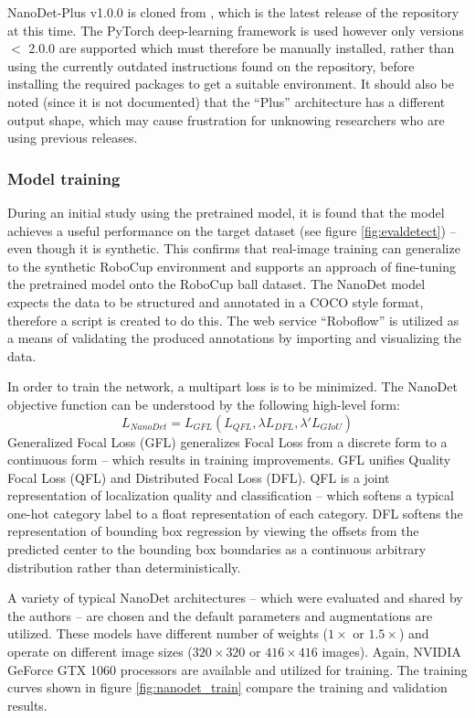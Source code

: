 \documentclass[a4paper,twoside,12pt]{report}
\begin{document}
NanoDet-Plus v1.0.0 is cloned from \cite{nanodet}, which is the latest release of the repository at this time. The PyTorch deep-learning framework is used however only versions $<$ 2.0.0 are supported which must therefore be manually installed, rather than using the currently outdated instructions found on the repository, before installing the required packages to get a suitable environment. It should also be noted (since it is not documented) that the ``Plus'' architecture has a different output shape, which may cause frustration for unknowing researchers who are using previous releases.

\subsubsection{Model training}

During an initial study using the pretrained model, it is found that the model achieves a useful performance on the target dataset (see figure \ref{fig:evaldetect}) -- even though it is synthetic. This confirms that real-image training can generalize to the synthetic RoboCup environment and supports an approach of fine-tuning the pretrained model onto the RoboCup ball dataset. The NanoDet model expects the data to be structured and annotated in a COCO style format, therefore a script is created to do this. The web service ``Roboflow'' \citep{roboflow} is utilized as a means of validating the produced annotations by importing and visualizing the data. 

In order to train the network, a multipart loss is to be minimized. The NanoDet objective function can be understood by the following high-level form:
\begin{equation}
L_{NanoDet} =  L_{GFL}(L_{QFL}, \lambda L_{DFL}, \lambda' L_{GIoU})
\end{equation} 
Generalized Focal Loss (GFL) \citep{gflloss} generalizes Focal Loss from a discrete form to a continuous form -- which results in training improvements. GFL unifies Quality Focal Loss (QFL) and Distributed Focal Loss (DFL). QFL is a joint representation of localization quality and classification -- which softens a typical one-hot category label to a float representation of each category. DFL softens the representation of bounding box regression by viewing the offsets from the predicted center to the bounding box boundaries as a continuous arbitrary distribution rather than deterministically.

A variety of typical NanoDet architectures -- which were evaluated and shared by the authors -- are chosen and the default parameters and augmentations are utilized. These models have different number of weights ($1\times$ or $1.5\times$) and operate on different image sizes ($320\times320$ or $416\times416$ images). Again, NVIDIA GeForce GTX 1060 processors are available and utilized for training. The training curves shown in figure \ref{fig:nanodet_train} compare the training and validation results.
\end{document}
